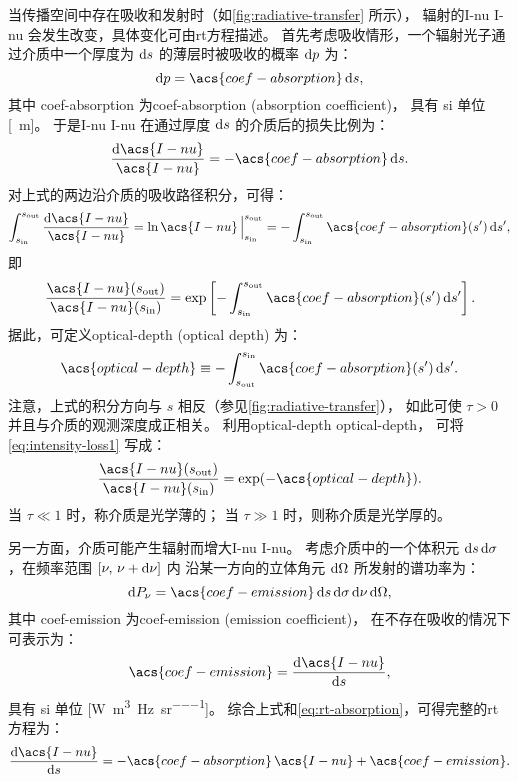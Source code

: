 当传播空间中存在吸收和发射时（如\autoref{fig:radiative-transfer} 所示），
辐射的\acl{I-nu} \acs{I-nu} 会发生改变，具体变化可由\acf{rt}方程描述。
首先考虑吸收情形，一个辐射光子通过介质中一个厚度为 $\mathrm{d}s$ 的薄层时被吸收的概率 $\mathrm{d}p$ 为：
\begin{equation}
  \D{p} = \acs{coef-absorption} \,\D{s} ,
\end{equation}
其中 \acs{coef-absorption}
为\acl{coef-absorption} (absorption coefficient)，
具有 \ac{si} 单位 [\si{\per\meter}]。
于是\acl{I-nu} \acs{I-nu} 在通过厚度 $\mathrm{d}s$ 的介质后的损失比例为：
\begin{equation}
  \label{eq:rt-absorption}
  \frac{\D{\acs{I-nu}}}{\acs{I-nu}} = - \acs{coef-absorption} \,\D{s} .
\end{equation}
对上式的两边沿介质的吸收路径积分，可得：
\begin{equation}
  \int_{s_{\R{in}}}^{s_{\R{out}}} \frac{\D{\acs{I-nu}}}{\acs{I-nu}}
    = \ln\acs{I-nu} \,\Big|_{s_{\R{in}}}^{s_{\R{out}}}
    = - \int_{s_{\R{in}}}^{s_{\R{out}}} \acs{coef-absorption}(s') \,\D{s'} ,
\end{equation}
即
\begin{equation}
  \label{eq:intensity-loss1}
  \frac{\acs{I-nu}(s_{\R{out}})}{\acs{I-nu}(s_{\R{in}})} =
    \exp \left[ - \int_{s_{\R{in}}}^{s_{\R{out}}}
      \acs{coef-absorption}(s') \,\D{s'} \right] .
\end{equation}
据此，可定义\acl{optical-depth} (optical depth) 为：
\begin{equation}
  \label{eq:optical-depth}
  \acs{optical-depth} \equiv
    - \int_{s_{\R{out}}}^{s_{\R{in}}} \acs{coef-absorption}(s') \,\D{s'} .
\end{equation}
注意，上式的积分方向与 $s$ 相反（参见\autoref{fig:radiative-transfer}），
如此可使 $\tau > 0$ 并且与介质的观测深度成正相关。
利用\acl{optical-depth} \acs{optical-depth}，
可将\autoref{eq:intensity-loss1} 写成：
\begin{equation}
  \label{eq:intensity-loss}
  \frac{\acs{I-nu}(s_{\R{out}})}{\acs{I-nu}(s_{\R{in}})} =
    \exp (-\acs{optical-depth}) .
\end{equation}
当 $\tau \ll 1$ 时，称介质是光学薄的；
当 $\tau \gg 1$ 时，则称介质是光学厚的。

另一方面，介质可能产生辐射而增大\acl{I-nu} \acs{I-nu}。
考虑介质中的一个体积元 $\mathrm{d}s\,\mathrm{d}\sigma$，在频率范围 $[\nu, \,\nu+\mathrm{d}\nu]$ 内
沿某一方向的立体角元 $\mathrm{d}\Omega$ 所发射的谱功率为：
\begin{equation}
  \D{P_{\nu}} =
    \acs{coef-emission} \,\D{s}\,\D{\sigma}\,\D{\nu}\,\D{\Omega} ,
\end{equation}
其中 \acs{coef-emission} 为\acl{coef-emission} (emission coefficient)，
在不存在吸收的情况下可表示为：
\begin{equation}
  \label{eq:coef-emission}
  \acs{coef-emission} = \diff{\acs{I-nu}}{s} ,
\end{equation}
具有 \ac{si} 单位 [\si{\watt\per\cubic\meter\per\hertz\per\steradian}]。
综合上式和\autoref{eq:rt-absorption}，可得完整的\ac{rt}方程为：
\begin{equation}
  \label{eq:radiative-transfer}
  \diff{\acs{I-nu}}{s} =
    - \acs{coef-absorption} \,\acs{I-nu} + \acs{coef-emission} .
\end{equation}

